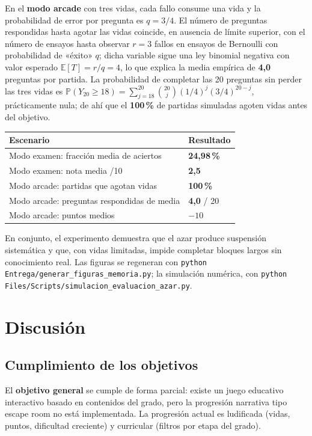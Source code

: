 \documentclass[11pt,a4paper]{article}
\newcommand{\iniciotabla}{\par\medskip\renewcommand{\arraystretch}{1.12}}
\newcommand{\fintabla}{\par\medskip}
\begin{document}
En el \textbf{modo arcade} con tres vidas, cada fallo consume una vida y la probabilidad de error por pregunta es $q = 3/4$. El número de preguntas respondidas hasta agotar las vidas coincide, en ausencia de límite superior, con el número de ensayos hasta observar $r = 3$ fallos en ensayos de Bernoulli con probabilidad de «éxito» $q$; dicha variable sigue una ley binomial negativa con valor esperado $\mathbb{E}[T] = r/q = 4$, lo que explica la media empírica de \textbf{4,0} preguntas por partida. La probabilidad de completar las 20 preguntas sin perder las tres vidas es $\mathbb{P}(Y_{20} \geq 18) = \sum_{j=18}^{20}\binom{20}{j}(1/4)^j(3/4)^{20-j}$, prácticamente nula; de ahí que el \textbf{100\,\%} de partidas simuladas agoten vidas antes del objetivo.

\iniciotabla
\begin{tabular}{@{}ll@{}}
\toprule
\textbf{Escenario} & \textbf{Resultado} \\
\midrule
Modo examen: fracción media de aciertos & \textbf{24,98\,\%} \\
Modo examen: nota media /10 & \textbf{2,5} \\
Modo arcade: partidas que agotan vidas & \textbf{100\,\%} \\
Modo arcade: preguntas respondidas de media & \textbf{4,0} / 20 \\
Modo arcade: puntos medios & \textbf{$-10$} \\
\bottomrule
\end{tabular}
\label{tab:mc-resumen}
\fintabla

En conjunto, el experimento demuestra que el azar produce suspensión sistemática y que, con vidas limitadas, impide completar bloques largos sin conocimiento real. Las figuras se regeneran con \texttt{python Entrega/generar\_figuras\_memoria.py}; la simulación numérica, con \texttt{python Files/Scripts/simulacion\_evaluacion\_azar.py}.

\section{Discusión}

\subsection{Cumplimiento de los objetivos}

El \textbf{objetivo general} se cumple de forma parcial: existe un juego educativo interactivo basado en contenidos del grado, pero la progresión narrativa tipo escape room no está implementada. La progresión actual es ludificada (vidas, puntos, dificultad creciente) y curricular (filtros por etapa del grado).
\end{document}
